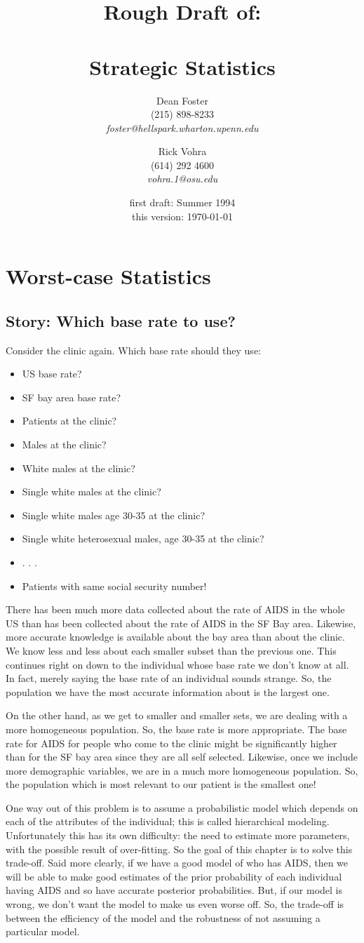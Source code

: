 \documentclass{book}
\title{Rough Draft of: \\ \quad
  \\
  Strategic Statistics}
\author{Dean Foster\\ (215) 898-8233 \\ 
        {\it foster@hellspark.wharton.upenn.edu}
\and
Rick Vohra \\ (614) 292 4600 \\ {\it vohra.1@osu.edu}}
\date{first draft: Summer 1994\\ 
  this version: \today 
   }
\begin{document}
\chapter{Worst-case Statistics}
\label{chap:worst_case} 
 
    \section{Story: Which base rate to use?}

Consider the clinic again.  Which base rate should they use:
\begin{itemize}
\item US base rate?
\item SF bay area base rate?
\item Patients at the clinic?
\item Males at the clinic?
\item White males at the clinic?
\item Single white males at the clinic?
\item Single white males age 30-35 at the clinic?
\item Single white heterosexual males, age 30-35 at the clinic?
\item . . .
\item Patients with same social security number!
\end{itemize}

There has been much more data collected about the rate of AIDS in the
whole US than has been collected about the rate of AIDS in the SF Bay
area.  Likewise, more accurate knowledge is available about the bay
area than about the clinic.  We know less and less about each smaller
subset than the previous one.  This continues right on down to the
individual whose base rate we don't know at all.  In fact, merely
saying the base rate of an individual sounds strange.  So, the
population we have the most accurate information about is the largest
one.

On the other hand, as we get to smaller and smaller sets, we are
dealing with a more homogeneous population.  So, the base rate is more
appropriate.  The base rate for AIDS for people who come to the clinic
might be significantly higher than for the SF bay area since they are
all self selected.  Likewise, once we include more demographic
variables, we are in a much more homogeneous population.  So, the
population which is most relevant to our patient is the smallest one! 

One way out of this problem is to assume a probabilistic model which
depends on each of the attributes of the individual; this is called
hierarchical modeling.  Unfortunately this has its own difficulty: the
need to estimate more parameters, with the possible result of
over-fitting.  So the goal of this chapter is to solve this trade-off.
Said more clearly, if we have a good model of who has AIDS, then we
will be able to make good estimates of the prior probability of each
individual having AIDS and so have accurate posterior probabilities.
But, if our model is wrong, we don't want the model to make us even
worse off.  So, the trade-off is between the efficiency of the model
and the robustness of not assuming a particular model.
\end{document}
